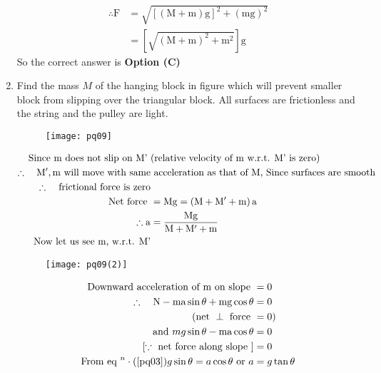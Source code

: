 \begin{enumerate}[label=\color{ocre}\textbf{\arabic*.}]
\begin{answer}
\begin{align*}
		\therefore \mathrm{F}&=\sqrt{[(\mathrm{M}+\mathrm{m}) \mathrm{g}]^{2}+(\mathrm{mg})^{2}}\\&=\left[\sqrt{(\mathrm{M}+\mathrm{m})^{2}+\mathrm{m}^{2}}\right] \mathrm{g}
		\end{align*}
		So the correct answer is \textbf{Option (C)}
	\end{answer}
	\item Find the mass $M$ of the hanging block in figure which will prevent smaller block from slipping over the triangular block. All surfaces are frictionless and the string and the pulley are light.
	\begin{figure}[H]
		\centering
		\texttt{[image: pq09]}
	\end{figure}
	\begin{answer}
		\begin{align}
		\text{Since $\mathrm{m}$ does not slip on M' }&\text{(relative velocity of $\mathrm{m}$ w.r.t. M' is zero)}\notag\\
		\text{$\therefore \quad \mathrm{M}^{\prime}, \mathrm{m}$  will move with same}&\text{  acceleration as that of $\mathrm{M}$, Since surfaces are smooth}\notag\\
		\text{$\therefore$ \quad frictional force is zero}\notag\\
		\text{Net force }&=\mathrm{Mg}=\left(\mathrm{M}+\mathrm{M}^{\prime}+\mathrm{m}\right) \mathrm{a}\notag\\
		\therefore \mathrm{a}&=\frac{\mathrm{Mg}}{\mathrm{M}+\mathrm{M}^{\prime}+\mathrm{m}}\label{pq01}\\
		\text{Now let us see m, w.r.t. M'}\notag
		\end{align}
		\begin{figure}[H]
			\centering
			\texttt{[image: pq09(2)]}
		\end{figure}
		\begin{align}
		\text{Downward acceleration of $\mathrm{m}$ on slope }&=0\notag\\
		\therefore \quad \mathrm{N}-\mathrm{ma} \sin \theta+\mathrm{mg} \cos \theta&=0\\
		(\text{net }\perp\text{ force }&=0)\notag\\
		\text{and }m g \sin \theta-\operatorname{ma} \cos \theta&=0\label{pq03}\\
		[\because\text{ net force along slope }]&=0\notag\\
		\text{From eq }^{n} \cdot(\ref{pq03}) g \sin \theta=a \cos \theta\text{ or }a&=g \tan \theta\label{pq04}\\

\end{align}
\end{answer}
\end{enumerate}

